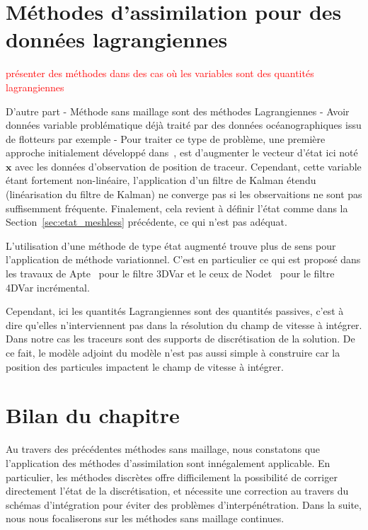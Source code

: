 \section{Méthodes d'assimilation pour des données lagrangiennes}
\textcolor{red}{présenter des méthodes dans des cas où les variables sont des quantités lagrangiennes}

D'autre part
- Méthode sans maillage sont des méthodes Lagrangiennes
- Avoir données variable problématique déjà traité par des données océanographiques issu de flotteurs par exemple
- Pour traiter ce type de problème, une première approche initialement développé dans~\cite{ide_2002}, est d'augmenter le vecteur d'état ici noté $\bm x$ avec les données d'observation de position de traceur. Cependant, cette variable étant fortement non-linéaire, l'application d'un filtre de Kalman étendu (linéarisation du filtre de Kalman) ne converge pas si les observaitions ne sont pas suffisemment fréquente. Finalement, cela revient à définir l'état comme dans la Section~\ref{sec:etat_meshless} précédente, ce qui n'est pas adéquat.

L'utilisation d'une méthode de type état augmenté trouve plus de sens pour l'application de méthode variationnel.
C'est en particulier ce qui est proposé dans les travaux de Apte~\cite{apte_2008} pour le filtre 3DVar et le ceux de Nodet~\cite{nodet_2006} pour le filtre 4DVar incrémental.

Cependant, ici les quantités Lagrangiennes sont des quantités passives, c'est à dire qu'elles n'interviennent pas dans la résolution du champ de vitesse à intégrer. Dans notre cas les traceurs sont des supports de discrétisation de la solution. De ce fait, le modèle adjoint du modèle n'est pas aussi simple à construire car la position des particules impactent le champ de vitesse à intégrer.

\section{Bilan du chapitre}

Au travers des précédentes méthodes sans maillage, nous constatons que l'application des méthodes d'assimilation sont innégalement applicable. En particulier, les méthodes discrètes offre difficilement la possibilité de corriger directement l'état de la discrétisation, et nécessite une correction au travers du schémas d'intégration pour éviter des problèmes d'interpénétration. Dans la suite, nous nous focaliserons sur les méthodes sans maillage continues.

